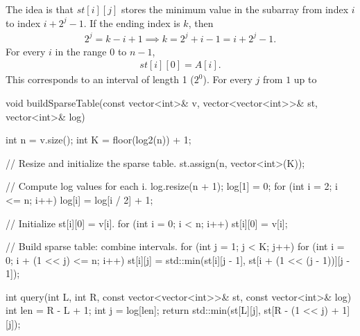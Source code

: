 \documentclass{report}
\begin{document}
    The idea is that $st[i][j]$ stores the minimum value in the subarray from index $i$ to index $i+2^{j} -1$. If the ending index is $k$, then 
    \begin{align*}
        2^{j} = k-i+1 \implies k = 2^{j} + i -1 = i +2^{j} -1
    .\end{align*}
    For every $i$ in the range $0$ to $n-1$, 
    \begin{align*}
        st[i][0] = A[i]
    .\end{align*}
    This corresponds to an interval of length 1 ($2^{0}$).
    \bigbreak \noindent 
    For every $j$ from $1$ up to $ $

    \pagebreak 
    \begin{cppcode}
        void buildSparseTable(const vector<int>& v, vector<vector<int>>& st, vector<int>& log) {
            int n = v.size();
            int K = floor(log2(n)) + 1;

            // Resize and initialize the sparse table.
            st.assign(n, vector<int>(K));

            // Compute log values for each i.
            log.resize(n + 1);
            log[1] = 0;
            for (int i = 2; i <= n; i++) {
                log[i] = log[i / 2] + 1;
            }

            // Initialize st[i][0] = v[i].
            for (int i = 0; i < n; i++) {
                st[i][0] = v[i];
            }

            // Build sparse table: combine intervals.
            for (int j = 1; j < K; j++) {
                for (int i = 0; i + (1 << j) <= n; i++) {
                    st[i][j] = std::min(st[i][j - 1], st[i + (1 << (j - 1))][j - 1]);
                }
            }
        }

        int query(int L, int R, const vector<vector<int>>& st, const vector<int>& log) {
            int len = R - L + 1;
            int j = log[len];
            return std::min(st[L][j], st[R - (1 << j) + 1][j]);
        }
    \end{cppcode}
    \bigbreak \noindent 


    



    \pagebreak \bigbreak \noindent 
\end{document}
